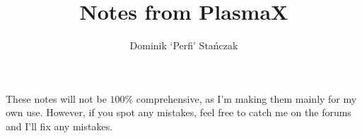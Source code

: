 
\title{Notes from PlasmaX}
\author{Dominik `Perfi' Stańczak}


\maketitle


These notes will not be $100\%$ comprehensive, as I'm making them mainly for my own use. However, if you spot any mistakes, feel free to catch me on the forums and I'll fix any mistakes. 



\newpage



\newpage



\newpage

